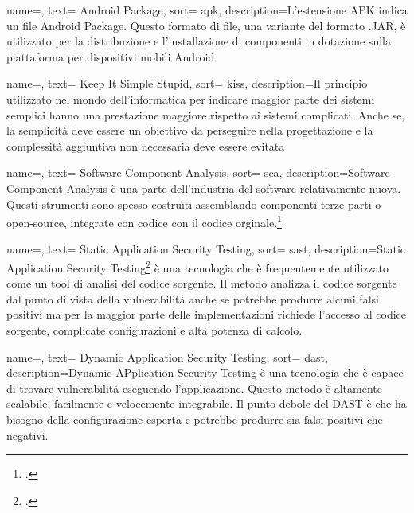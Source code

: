 {
name=,
text= Android Package,
sort= apk,
description={L'estensione APK indica un file Android Package.
Questo formato di file, una variante del formato .JAR, è utilizzato per la distribuzione e l'installazione di componenti in dotazione sulla piattaforma per dispositivi mobili Android}
}

{
name=,
text= Keep It Simple Stupid,
sort= kiss,
description={Il principio utilizzato nel mondo dell'informatica per indicare maggior parte dei sistemi semplici hanno una prestazione maggiore rispetto ai sistemi complicati.
Anche se, la semplicità deve essere un obiettivo da perseguire nella progettazione e la complessità aggiuntiva non necessaria deve essere evitata}
}

{
name=,
text= Software Component Analysis,
sort= sca,
description={Software Component Analysis è una parte dell'industria del software relativamente nuova. Questi strumenti sono spesso costruiti assemblando componenti terze parti o open-source, integrate con codice con il codice orginale.\footcite{site:sca}}
}

{
name=,
text= Static Application Security Testing,
sort= sast,
description={Static Application Security Testing\footcite{site:sast} è una tecnologia che è frequentemente utilizzato come un tool di analisi del codice sorgente. Il metodo analizza il codice sorgente dal punto di vista della vulnerabilità anche se potrebbe produrre alcuni falsi positivi ma per la maggior parte delle implementazioni richiede l'accesso al codice sorgente, complicate configurazioni e alta potenza di calcolo.}
}


{
name=,
text= Dynamic Application Security Testing,
sort= dast,
description={Dynamic APplication Security Testing è una tecnologia che è capace di trovare vulnerabilità eseguendo l'applicazione. Questo metodo è altamente scalabile, facilmente e velocemente integrabile. Il punto debole del DAST è che ha bisogno della configurazione esperta e potrebbe produrre sia falsi positivi che negativi.}
}

